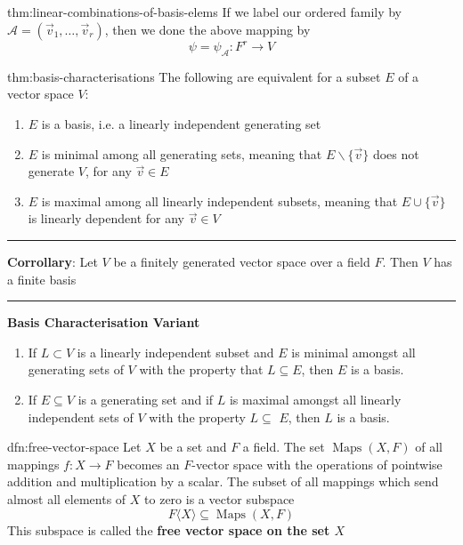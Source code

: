 \documentclass[landscape, 8pt]{extarticle}
\DeclareMathOperator{\Maps}{Maps}
\begin{document}
\begin{multicols}{3}
\begin{thm}{thm:linear-combinations-of-basis-elems}{}
    If we label our ordered family by $\mathcal{A} = (\vec{v}_{1},\dots,\vec{v}_{r})$, then we done the above mapping by
    \[\psi = \psi_{\mathcal{A}} : F^{r}\to V\]
\end{thm}

\vspace{-5pt}
\begin{thm}{thm:basis-characterisations}{}
    The following are equivalent for a subset $E$ of a vector space $V$:
    \begin{enumerate}
        \setlength\itemsep{0em}
        \item $E$ is a basis, i.e. a linearly independent generating set
        \item $E$ is minimal among all generating sets, meaning that $E \backslash \{\vec{v}\}$ does not generate $V$, for any $\vec{v}\in E$
        \item $E$ is maximal among all linearly independent subsets, meaning that $E \cup \{\vec{v}\}$ is linearly dependent for any $\vec{v}\in V$
    \end{enumerate}

    \vspace{-10pt}
    \noindent\rule{\textwidth}{0.2pt}
    \textbf{Corrollary}: Let $V$ be a finitely generated vector space over a field $F$. Then $V$ has a finite basis

    \noindent\rule{\textwidth}{0.2pt}
    \textbf{Basis Characterisation Variant}
    \begin{enumerate}
        \setlength\itemsep{0em}
        \item If $L \subset V$ is a linearly independent subset and $E$ is minimal amongst all generating sets of $V$ with the property that $L \subseteq E$, then $E$ is a basis.
        \item If $E \subseteq V$ is a generating set and if $L$ is maximal amongst all linearly independent sets of $V$ with the property $L \subseteq$ $E$, then $L$ is a basis.
    \end{enumerate}
\end{thm}

\vspace{-5pt}
\begin{dfn}{dfn:free-vector-space}{}
    Let $X$ be a set and $F$ a field. The set $\Maps(X, F)$ of all mappings $f: X \to F $ becomes an $F$-vector space with the operations of pointwise addition and multiplication by a scalar. The subset of all mappings which send almost all elements of $X$ to zero is a vector subspace
    \[F\langle X \rangle \subseteq \Maps(X, F)\]
    This subspace is called the \textbf{free vector space on the set $X$}
\end{dfn}


\end{multicols}
\end{document}
